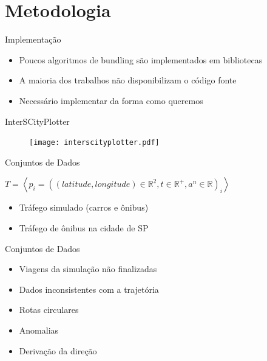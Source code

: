 \section{Metodologia}

\begin{frame}{Implementação}
  \begin{itemize}
    \item Poucos algoritmos de bundling são implementados em bibliotecas
    \item A maioria dos trabalhos não disponibilizam o código fonte
    \item Necessário implementar da forma como queremos
  \end{itemize}
\end{frame}

{
\begin{frame}{InterSCityPlotter}
  \begin{figure}[!htb]
    \centering
    \texttt{[image: interscityplotter.pdf]}
  \end{figure}
\end{frame}
}

\begin{frame}{Conjuntos de Dados}

  \begin{center}
  $T = \left\langle p_i = ((latitude, longitude) \in \mathbb{R}^2, t \in \mathbb{R}^+, a^n \in \mathbb{R})_i \right\rangle$
  \end{center}

  \begin{itemize}
    \item Tráfego simulado (carros e ônibus)
    \item Tráfego de ônibus na cidade de SP
  \end{itemize}
\end{frame}

\begin{frame}{Conjuntos de Dados}
  \begin{itemize}
    \item Viagens da simulação não finalizadas
    \item Dados inconsistentes com a trajetória
    \item Rotas circulares
    \item Anomalias
    \item Derivação da direção
  \end{itemize}
\end{frame}

